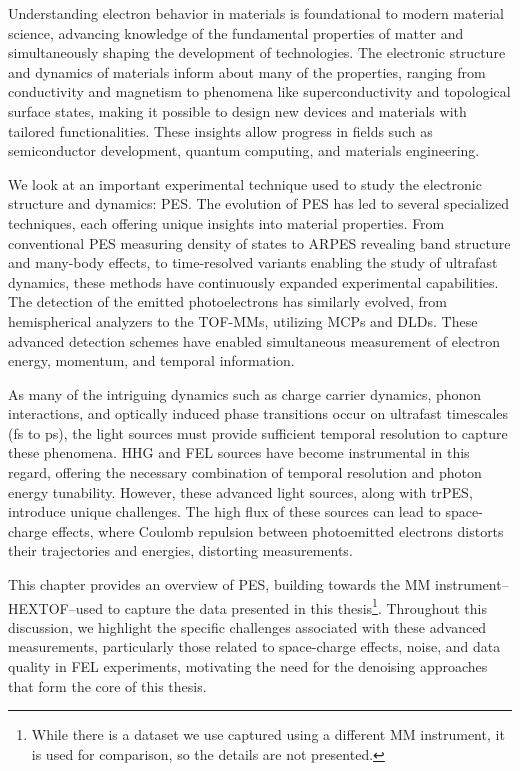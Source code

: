 
Understanding electron behavior in materials is foundational to modern material science, advancing knowledge of the fundamental properties of matter and simultaneously shaping the development of technologies. The electronic structure and dynamics of materials inform about many of the properties, ranging from conductivity and magnetism to phenomena like superconductivity and topological surface states, making it possible to design new devices and materials with tailored functionalities. These insights allow progress in fields such as semiconductor development, quantum computing, and materials engineering.

We look at an important experimental technique used to study the electronic structure and dynamics: \gls{PES}. The evolution of \gls{PES} has led to several specialized techniques, each offering unique insights into material properties. From conventional \gls{PES} measuring density of states to \gls{ARPES} revealing band structure and many-body effects, to time-resolved variants enabling the study of ultrafast dynamics, these methods have continuously expanded experimental capabilities. The detection of the emitted photoelectrons has similarly evolved, from hemispherical analyzers to the \gls{TOF}-\glspl{MM}, utilizing \glspl{MCP} and \glspl{DLD}. These advanced detection schemes have enabled simultaneous measurement of electron energy, momentum, and temporal information.

As many of the intriguing dynamics such as charge carrier dynamics, phonon interactions, and optically induced phase transitions occur on ultrafast timescales (\unit{fs} to \unit{ps}), the light sources must provide sufficient temporal resolution to capture these phenomena. \Gls{HHG} and \gls{FEL} sources have become instrumental in this regard, offering the necessary combination of temporal resolution and photon energy tunability. However, these advanced light sources, along with \gls{trPES}, introduce unique challenges. The high flux of these sources can lead to space-charge effects, where Coulomb repulsion between photoemitted electrons distorts their trajectories and energies, distorting measurements.

This chapter provides an overview of \gls{PES}, building towards the \gls{MM} instrument--HEXTOF--used to capture the data presented in this thesis\footnote{While there is a dataset we use captured using a different \gls{MM} instrument, it is used for comparison, so the details are not presented.}. Throughout this discussion, we highlight the specific challenges associated with these advanced measurements, particularly those related to space-charge effects, noise, and data quality in \gls{FEL} experiments, motivating the need for the denoising approaches that form the core of this thesis.

